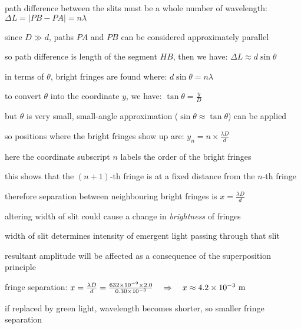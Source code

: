 path difference between the slits must be a whole number of wavelength: $ \Delta L = \big|PB-PA\big| = n\lambda $

since $D \gg d$, paths $PA$ and $PB$ can be considered approximately parallel

so path difference is length of the segment $HB$, then we have: $\Delta L \approx d\sin\theta$

in terms of $\theta$, bright fringes are found where: $ d\sin\theta = n\lambda $

to convert $\theta$ into the coordinate $y$, we have: $\tan \theta = \frac{y}{D}$

but $\theta$ is very small, small-angle approximation ($\sin \theta \approx \tan \theta$) can be applied

so positions where the bright fringes show up are: $ y_n =  n \times \frac{\lambda D}{d} $

here the coordinate subscript $n$ labels the order of the bright fringes

this shows that the $(n+1)$-th fringe is at a fixed distance from the $n$-th fringe

therefore separation between neighbouring bright fringes is $ {x=\frac{\lambda D}{d}} $ \eoe

\cmt altering width of slit could cause a change in \emph{brightness} of fringes

width of slit determines intensity of emergent light passing through that slit

resultant amplitude will be affected as a consequence of the superposition principle


\sol fringe separation: $ x = \frac{\lambda D}{d} = \frac{632 \times 10^{-9} \times 2.0 }{0.30 \times 10^{-3}} \quad \Rightarrow \quad x \approx 4.2 \times 10^{-3} \text{ m}$

if replaced by green light, wavelength becomes shorter, so smaller fringe separation \eoe



